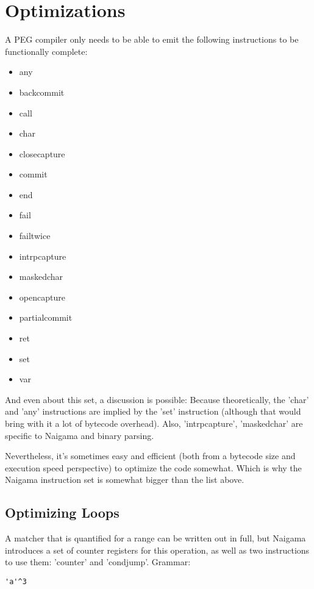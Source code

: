 \section{Optimizations}

A PEG compiler only needs to be able to emit the following instructions to be
functionally complete:

\begin{itemize}
\item any
\item backcommit
\item call
\item char
\item closecapture
\item commit
\item end
\item fail
\item failtwice
\item intrpcapture
\item maskedchar
\item opencapture
\item partialcommit
\item ret
\item set
\item var
\end{itemize}

And even about this set, a discussion is possible:
Because theoretically, the 'char' and 'any' instructions are implied by
the 'set' instruction
(although that would bring with it a lot of bytecode overhead).
Also, 'intrpcapture', 'maskedchar' are specific to Naigama and
binary parsing.

Nevertheless, it's sometimes easy and efficient (both from a bytecode
size and execution speed perspective) to optimize the code somewhat.
Which is why the Naigama instruction set is somewhat bigger than the
list above.

\subsection{Optimizing Loops}
A matcher that is quantified for a range can be written out in
full, but Naigama introduces a set of counter registers for this operation,
as well as two instructions to use them: 'counter' and 'condjump'.
Grammar:

\begin{myquote}
\begin{verbatim}
'a'^3
\end{verbatim}
\end{myquote}

